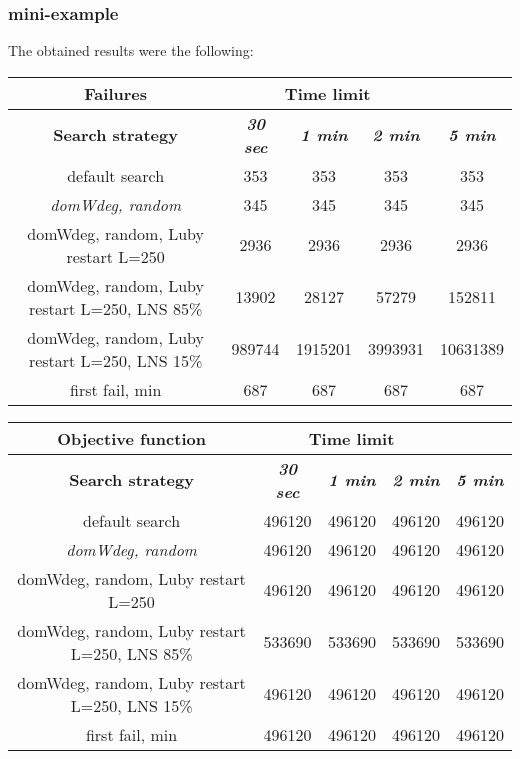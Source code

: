 \subsubsection{mini-example}
The obtained results were the following:
{
\renewcommand{\arraystretch}{2}
\begin{longtable}[h]{| c | c | c | c | c |}
    \hline
    \textbf{Failures} & \multicolumn{3}{c}{Time limit} & \\
    \hline
    \textbf{Search strategy} & \textbf{\textit{30 sec}} & \textbf{\textit{1 min}} & \textbf{\textit{2 min}} & \textbf{\textit{5 min}} \\
    \hline
    \endhead
    default search                                &    353 &     353 &     353 &      353 \\
    \hline
    \textit{domWdeg, random}                      &    345 &     345 &     345 &      345 \\
    \hline
    domWdeg, random, Luby restart L=250           &   2936 &    2936 &    2936 &     2936 \\
    \hline
    domWdeg, random, Luby restart L=250, LNS 85\% &  13902 &   28127 &   57279 &   152811 \\
    \hline
    domWdeg, random, Luby restart L=250, LNS 15\% & 989744 & 1915201 & 3993931 & 10631389 \\
    \hline
    first fail, min                               &    687 &     687 &     687 &      687 \\
    \hline
\end{longtable}
}

{
\renewcommand{\arraystretch}{2}
\begin{longtable}[h]{| c | c | c | c | c |}
    \hline
    \textbf{Objective function} & \multicolumn{3}{c}{Time limit} & \\
    \hline
    \textbf{Search strategy} & \textbf{\textit{30 sec}} & \textbf{\textit{1 min}} & \textbf{\textit{2 min}} & \textbf{\textit{5 min}} \\
    \hline
    \endhead
    default search                                & 496120 & 496120 & 496120 & 496120 \\
    \hline
    \textit{domWdeg, random}                      & 496120 & 496120 & 496120 & 496120 \\
    \hline
    domWdeg, random, Luby restart L=250           & 496120 & 496120 & 496120 & 496120 \\
    \hline
    domWdeg, random, Luby restart L=250, LNS 85\% & 533690 & 533690 & 533690 & 533690 \\
    \hline
    domWdeg, random, Luby restart L=250, LNS 15\% & 496120 & 496120 & 496120 & 496120 \\
    \hline
    first fail, min                               & 496120 & 496120 & 496120 & 496120 \\
    \hline
\end{longtable}
}
